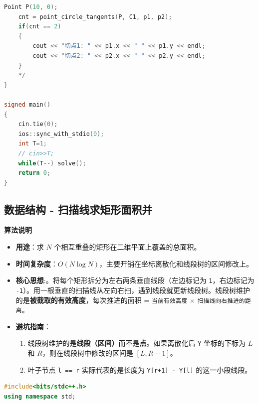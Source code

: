 \documentclass[10pt,landscape,a4paper]{article}
\begin{document}
\begin{multicols*}{3}
\begin{lstlisting}[language=C++]
    Point P(10, 0);
    cnt = point_circle_tangents(P, C1, p1, p2);
    if(cnt == 2)
    {
        cout << "切点1: " << p1.x << " " << p1.y << endl;
        cout << "切点2: " << p2.x << " " << p2.y << endl;
    }
    */
}

signed main()
{
    cin.tie(0);
    ios::sync_with_stdio(0);
    int T=1;
    // cin>>T;
    while(T--) solve();
    return 0;
}
\end{lstlisting}
\subsection*{数据结构 - 扫描线求矩形面积并}
\par\addvspace{0.7ex}\noindent\textbf{算法说明}\par\nobreak
\begin{itemize}
\item \textbf{用途}：求 $N$ 个相互重叠的矩形在二维平面上覆盖的总面积。
\item \textbf{时间复杂度}：$O(N \log N)$，主要开销在坐标离散化和线段树的区间修改上。
\item \textbf{核心思想}:。将每个矩形拆分为左右两条垂直线段（左边标记为 \texttt{1}，右边标记为 \texttt{-\allowbreak{}1}）。用一根垂直的扫描线从左向右扫，遇到线段就更新线段树。线段树维护的是\textbf{被截取的有效高度}，每次推进的面积 = \texttt{当\allowbreak{}前\allowbreak{}有\allowbreak{}效\allowbreak{}高\allowbreak{}度} $\times$ \texttt{扫\allowbreak{}描\allowbreak{}线\allowbreak{}向\allowbreak{}右\allowbreak{}推\allowbreak{}进\allowbreak{}的\allowbreak{}距\allowbreak{}离}。
\item \textbf{避坑指南}：
\begin{enumerate}[start=1]
\item 线段树维护的是\textbf{线段（区间）}而不是\textbf{点}。如果离散化后 \texttt{Y} 坐标的下标为 $L$ 和 $R$，则在线段树中修改的区间是 $[L, R-1]$。
\item 叶子节点 \texttt{l\allowbreak{} \allowbreak{}=\allowbreak{}=\allowbreak{} \allowbreak{}r} 实际代表的是长度为 \texttt{Y\allowbreak{}[\allowbreak{}r\allowbreak{}+\allowbreak{}1\allowbreak{}]\allowbreak{} \allowbreak{}-\allowbreak{} \allowbreak{}Y\allowbreak{}[\allowbreak{}l\allowbreak{}]} 的这一小段线段。
\end{enumerate}
\end{itemize}
\par{}\par
\begin{lstlisting}[language=C++]
#include<bits/stdc++.h>
using namespace std;


\end{lstlisting}
\end{multicols*}
\end{document}

